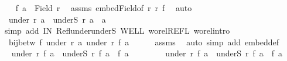 \begin{isabellebody}
%
\isadelimproof
%
\endisadelimproof
%
\isatagproof
{}\isamarkupfalse%
{\isacharminus}{\kern0pt}\isanewline
\ \ \isamarkupfalse%
\ {\isachardoublequoteopen}f\ a\ {\isasymin}\ Field\ r{\isacharprime}{\kern0pt}{\isachardoublequoteclose}\ \isamarkupfalse%
\ assms\ embed{\isacharunderscore}{\kern0pt}Field{\isacharbrackleft}{\kern0pt}of\ r\ r{\isacharprime}{\kern0pt}\ f{\isacharbrackright}{\kern0pt}\ \isamarkupfalse%
\ auto\isanewline
\ \ \isamarkupfalse%
\ \isamarkupfalse%
\ {}{\isacharcolon}{\kern0pt}\ {\isachardoublequoteopen}under\ r\ a\ {\isacharequal}{\kern0pt}\ underS\ r\ a\ {\isasymunion}\ {\isacharbraceleft}{\kern0pt}a{\isacharbraceright}{\kern0pt}{\isachardoublequoteclose}\isanewline
\ \ \ \ \isamarkupfalse%
\ {\isacharparenleft}{\kern0pt}simp\ add{\isacharcolon}{\kern0pt}\ IN\ Refl{\isacharunderscore}{\kern0pt}under{\isacharunderscore}{\kern0pt}underS\ WELL\ wo{\isacharunderscore}{\kern0pt}rel{\isachardot}{\kern0pt}REFL\ wo{\isacharunderscore}{\kern0pt}rel{\isachardot}{\kern0pt}intro{\isacharparenright}{\kern0pt}\isanewline
\ \ \isamarkupfalse%
\ \isamarkupfalse%
\ {}{\isacharcolon}{\kern0pt}\ {\isachardoublequoteopen}bij{\isacharunderscore}{\kern0pt}betw\ f\ {\isacharparenleft}{\kern0pt}under\ r\ a{\isacharparenright}{\kern0pt}\ {\isacharparenleft}{\kern0pt}under\ r{\isacharprime}{\kern0pt}\ {\isacharparenleft}{\kern0pt}f\ a{\isacharparenright}{\kern0pt}{\isacharparenright}{\kern0pt}{\isachardoublequoteclose}\isanewline
\ \ \ \ \isamarkupfalse%
\ assms\ \isamarkupfalse%
\ {\isacharparenleft}{\kern0pt}auto\ simp\ add{\isacharcolon}{\kern0pt}\ embed{\isacharunderscore}{\kern0pt}def{\isacharparenright}{\kern0pt}\ \isanewline
\ \ \isamarkupfalse%
\ \isamarkupfalse%
\ {\isachardoublequoteopen}under\ r{\isacharprime}{\kern0pt}\ {\isacharparenleft}{\kern0pt}f\ a{\isacharparenright}{\kern0pt}\ {\isacharequal}{\kern0pt}\ underS\ r{\isacharprime}{\kern0pt}\ {\isacharparenleft}{\kern0pt}f\ a{\isacharparenright}{\kern0pt}\ {\isasymunion}\ {\isacharbraceleft}{\kern0pt}f\ a{\isacharbraceright}{\kern0pt}{\isachardoublequoteclose}\isanewline
\ \ \isamarkupfalse%
\isanewline
\ \ \ \ \isamarkupfalse%
\ {\isachardoublequoteopen}under\ r{\isacharprime}{\kern0pt}\ {\isacharparenleft}{\kern0pt}f\ a{\isacharparenright}{\kern0pt}\ {\isasymsubseteq}\ underS\ r{\isacharprime}{\kern0pt}\ {\isacharparenleft}{\kern0pt}f\ a{\isacharparenright}{\kern0pt}\ {\isasymunion}\ {\isacharbraceleft}{\kern0pt}f\ a{\isacharbraceright}{\kern0pt}{\isachardoublequoteclose}\isanewline

\end{isabellebody}
